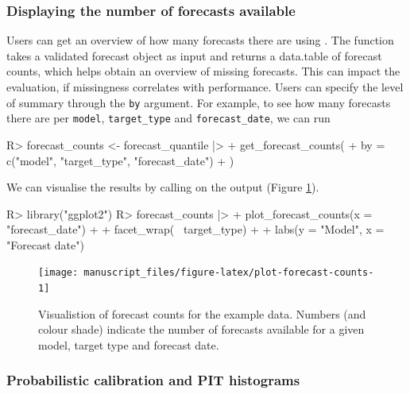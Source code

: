 \documentclass[
]{jss}
\begin{document}
\subsubsection{Displaying the number of forecasts
available}\label{displaying-the-number-of-forecasts-available}

Users can get an overview of how many forecasts there are using
. The function takes a validated forecast
object as input and returns a data.table of forecast counts, which helps
obtain an overview of missing forecasts. This can impact the evaluation,
if missingness correlates with performance. Users can specify the level
of summary through the \texttt{by} argument. For example, to see how
many forecasts there are per \texttt{model}, \texttt{target\_type} and
\texttt{forecast\_date}, we can run

\begin{CodeChunk}
\begin{CodeInput}
R> forecast_counts <- forecast_quantile |>
+   get_forecast_counts(
+     by = c("model", "target_type", "forecast_date")
+   )
\end{CodeInput}
\end{CodeChunk}

We can visualise the results by calling 
on the output (Figure \ref{fig:plot-forecast-counts}).

\begin{CodeChunk}
\begin{CodeInput}
R> library("ggplot2")
R> forecast_counts |>
+   plot_forecast_counts(x = "forecast_date") + 
+   facet_wrap(~ target_type) +
+   labs(y = "Model", x = "Forecast date")
\end{CodeInput}
\begin{figure}[!h]

{\centering \texttt{[image: manuscript\_files/figure-latex/plot-forecast-counts-1]} 

}

\caption[Visualistion of forecast counts for the example data]{Visualistion of forecast counts for the example data. Numbers (and colour shade) indicate the number of forecasts available for a given model, target type and forecast date.}\label{fig:plot-forecast-counts}
\end{figure}
\end{CodeChunk}

\subsubsection{Probabilistic calibration and PIT
histograms}\label{probabilistic-calibration-and-pit-histograms}
\end{document}
